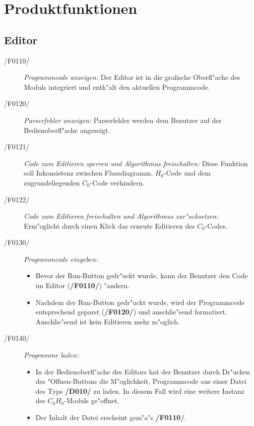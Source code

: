 \section{Produktfunktionen}


\subsection{Editor}
  \begin{description}
    \item[/F0110/]
      \textit{Programmcode anzeigen:} Der Editor ist in die grafische
      Oberfl"ache des Moduls integriert und enth"alt den aktuellen
      Programmcode.

    \item[/F0120/]
      \textit{Parserfehler anzeigen:} Parserfehler werden dem
      Benutzer auf der Bedienoberfl"ache angezeigt.

    \item[/F0121/]
      \textit{Code zum Editieren sperren und Algorithmus freischalten:}
      Diese Funktion soll Inkonsistenz zwischen Flussdiagramm, $H_0$-Code und
      dem zugrundeliegenden $C_0$-Code verhindern.

    \item[/F0122/]
      \textit{Code zum Editieren freischalten und Algorithmus zur"ucksetzen:}
      Erm"oglicht durch einen Klick das erneute Editieren des $C_0$-Codes.

    \item[/F0130/]
      \textit{Programmcode eingeben:}
      \begin{itemize}
        \item Bevor der Run-Button gedr"uckt wurde, kann der Benutzer den Code
        im Editor (\textbf{/F0110/}) "andern.
        \item Nachdem der Run-Button gedr"uckt wurde, wird der Programmcode
        entsprechend geparst (\textbf{/F0120/}) und anschlie"send formatiert.
        Anschlie"send ist kein Editieren mehr m"oglich.
      \end{itemize}

    \item[/F0140/]
      \textit{Programme laden:}
      \begin{itemize}
        \item In der Bedienoberfl"ache des Editors hat der Benutzer durch Dr"ucken des
        "Offnen-Buttons die M"oglichkeit, Programmcode aus einer Datei des Typs
        \textbf{/D010/} zu laden.
        In diesem Fall wird eine weitere Instanz des $C_0$$H_0$-Moduls ge"offnet.
				\item Der Inhalt der Datei erscheint gem"a"s \textbf{/F0110/}.
      \end{itemize}
    

\end{description}

